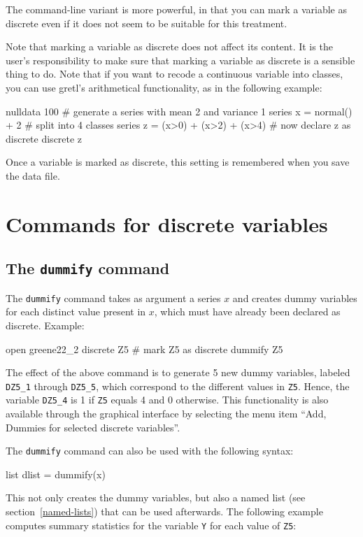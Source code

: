 The command-line variant is more powerful, in that you can mark a
variable as discrete even if it does not seem to be suitable for
this treatment.

Note that marking a variable as discrete does not affect its content.
It is the user's responsibility to make sure that marking a variable
as discrete is a sensible thing to do.  Note that if you want to
recode a continuous variable into classes, you can use gretl's
arithmetical functionality, as in the following example:
\begin{code}
nulldata 100
# generate a series with mean 2 and variance 1
series x = normal() + 2
# split into 4 classes
series z = (x>0) + (x>2) + (x>4)
# now declare z as discrete
discrete z
\end{code}

Once a variable is marked as discrete, this setting is remembered when
you save the data file.

\section{Commands for discrete variables}
\label{discr-commands}

\subsection{The \texttt{dummify} command}
\label{discr-dummify}

The \texttt{dummify} command takes as argument a series $x$ and creates
dummy variables for each distinct value present in $x$, which must
have already been declared as discrete.  Example:
\begin{code}
open greene22_2
discrete Z5 # mark Z5 as discrete
dummify Z5
\end{code}

The effect of the above command is to generate 5 new dummy variables,
labeled \texttt{DZ5\_1} through \texttt{DZ5\_5}, which correspond to
the different values in \texttt{Z5}. Hence, the variable
\texttt{DZ5\_4} is 1 if \texttt{Z5} equals 4 and 0 otherwise. This
functionality is also available through the graphical interface by
selecting the menu item ``Add, Dummies for selected discrete variables''.

The \texttt{dummify} command can also be used with the following
syntax:
\begin{code}
list dlist = dummify(x)
\end{code}
This not only creates the dummy variables, but also a named list (see
section~\ref{named-lists}) that can be used afterwards. The
following example computes summary statistics for the variable \texttt{Y} for
each value of \texttt{Z5}:

